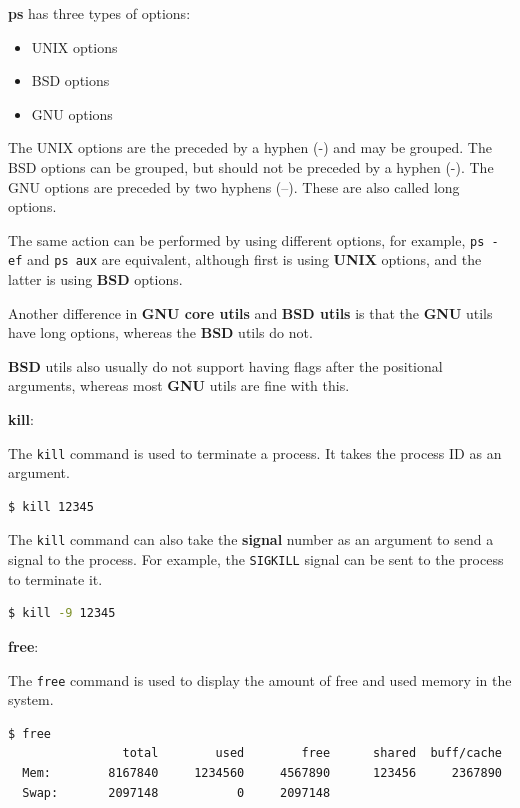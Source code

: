 \begin{remark}
  \textbf{ps} has three types of options:
  \begin{itemize}
    \item UNIX options
    \item BSD options
    \item GNU options
  \end{itemize}
  The UNIX options are the preceded by a hyphen (-{}) and may be grouped.
  The BSD options can be grouped, but should not be preceded by a hyphen (-{}).
  The GNU options are preceded by two hyphens (--).
  These are also called long options.

  The same action can be performed by using different options, for example, \texttt{ps -ef} and \texttt{ps aux} are equivalent, although first is using \textbf{UNIX} options, and the latter is using \textbf{BSD} options.

  Another difference in \textbf{GNU core utils} and \textbf{BSD utils} is that the \textbf{GNU} utils have long options, whereas the \textbf{BSD} utils do not.

  \textbf{BSD} utils also usually do not support having flags after the positional arguments, whereas most \textbf{GNU} utils are fine with this.
\end{remark}


\textbf{kill}:

The \texttt{kill} command is used to terminate a process.
It takes the process ID as an argument.

\begin{lstlisting}[language=bash]
  $ kill 12345
\end{lstlisting}

The \texttt{kill} command can also take the \textbf{signal} number as an argument to send a signal to the process.
For example, the \texttt{SIGKILL} signal can be sent to the process to terminate it.

\begin{lstlisting}[language=bash]
  $ kill -9 12345
\end{lstlisting}

\textbf{free}:

The \texttt{free} command is used to display the amount of free and used memory in the system.

\begin{lstlisting}[language=bash]
  $ free
                total        used        free      shared  buff/cache   available
  Mem:        8167840     1234560     4567890      123456     2367890     4567890
  Swap:       2097148           0     2097148
\end{lstlisting}

